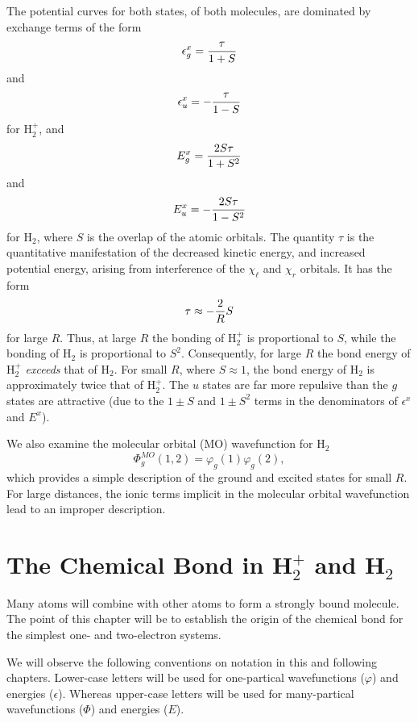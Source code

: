 The potential curves for both states, of both molecules, are dominated by
exchange terms of the form
\begin{equation}
\epsilon^x_g = {\tau \over 1 + S}
\end{equation}
and
\begin{equation}
\epsilon^x_u = -{\tau \over 1 - S}
\end{equation}
for H$^+_2$, and
\begin{equation}
E^x_g = {2 S \tau \over 1 + S^2}
\end{equation}
and
\begin{equation}
E^x_u = -{2 S \tau \over 1 - S^2}
\end{equation}
for H$_2$, where $S$ is the overlap of the atomic orbitals. The quantity 
$\tau$ is the quantitative manifestation of the decreased kinetic energy, 
and increased potential energy, arising from
interference of the $\chi_{\ell}$ and $\chi_r$ orbitals. It has the form
\begin{equation}
\tau \approx - {2 \over R}S
\end{equation}
for large $R$. Thus, at large $R$ the bonding of H$^+_2$ is
proportional to $S$, while the bonding of H$_2$ is proportional to
$S^2$.  Consequently, for large $R$ the bond energy of H$^+_2$
\emph{exceeds} that of H$_2$. For small $R$, where $S \approx 1$, the
bond energy of H$_2$ is approximately twice that of H$^+_2$. The $u$
states are far more repulsive than the $g$ states are attractive (due
to the $1 \pm S$ and $1 \pm S^2$ terms in the denominators of
$\epsilon^x$ and $E^x$).

We also examine the molecular orbital (MO) wavefunction for H$_2$
\begin{equation}
\Phi^{MO}_g (1,2) = \varphi_g(1) \varphi_g(2),
\end{equation}
which provides a simple description of the ground and excited states for 
small $R$. For large distances, the ionic terms implicit in the molecular 
orbital wavefunction lead to an improper description.

\section{The Chemical Bond in H$_2^+$ and H$_2$}
Many atoms will combine with other atoms to form a strongly bound 
molecule.  The point of this chapter will be to establish the origin 
of the chemical bond for the simplest one- and two-electron systems.

We will observe the following conventions on notation in this and following
chapters. Lower-case letters will be used for one-partical 
wavefunctions ($\varphi$) and energies ($\epsilon$).  Whereas upper-case 
letters will be used for many-partical wavefunctions ($\Phi$) and energies
($E$).

